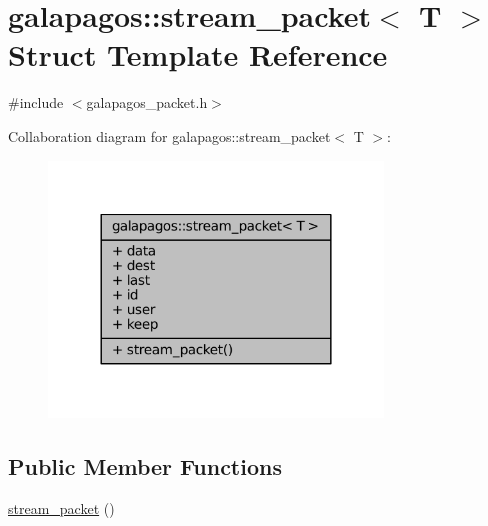 \hypertarget{structgalapagos_1_1stream__packet}{}\section{galapagos\+:\+:stream\+\_\+packet$<$ T $>$ Struct Template Reference}
\label{structgalapagos_1_1stream__packet}


{\ttfamily \#include $<$galapagos\+\_\+packet.\+h$>$}



Collaboration diagram for galapagos\+:\+:stream\+\_\+packet$<$ T $>$\+:
\nopagebreak
\begin{figure}[H]
\begin{center}
\leavevmode
\includegraphics[width=252pt]{structgalapagos_1_1stream__packet__coll__graph}
\end{center}
\end{figure}
\subsection*{Public Member Functions}
\begin{DoxyCompactItemize}
\item 
\hyperlink{structgalapagos_1_1stream__packet_af46f1b60d18aee3839505b109c9321a5}{stream\+\_\+packet} ()
\end{DoxyCompactItemize}
